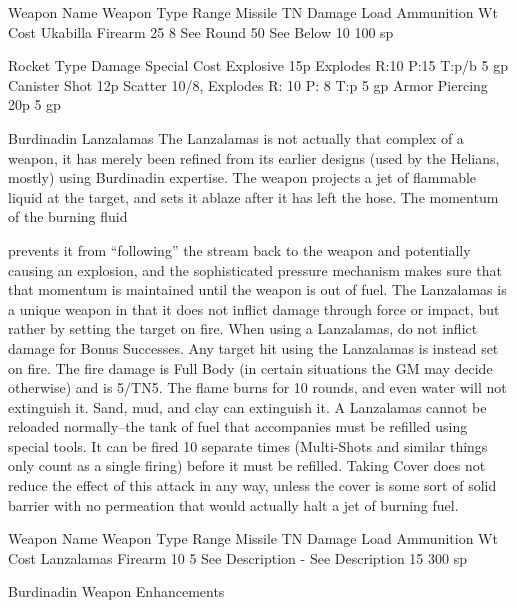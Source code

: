 \documentclass[oneside,11pt,english]{book}
\begin{document}
 

 

Weapon Name Weapon Type Range Missile TN Damage Load Ammunition Wt Cost 
Ukabilla Firearm 25 8 See Round 50 See Below 10 100 sp 

 

 

Rocket Type Damage Special Cost 
Explosive 15p Explodes R:10 P:15 T:p/b 5 gp 
Canister Shot 12p Scatter 10/8, Explodes R: 10 P: 8 T:p 5 gp 
Armor Piercing 20p 5 gp 

 

 

 

Burdinadin Lanzalamas 
The Lanzalamas is not actually that complex of a weapon, it has merely been refined from its earlier 
designs (used by the Helians, mostly) using Burdinadin expertise. The weapon projects a jet of flammable 
liquid at the target, and sets it ablaze after it has left the hose. The momentum of the burning fluid 


prevents it from “following” the stream back to the weapon and potentially causing an explosion, and the 
sophisticated pressure mechanism makes sure that that momentum is maintained until the weapon is out 
of fuel. 
The Lanzalamas is a unique weapon in that it does not inflict damage through force or impact, but rather 
by setting the target on fire. When using a Lanzalamas, do not inflict damage for Bonus Successes. Any 
target hit using the Lanzalamas is instead set on fire. The fire damage is Full Body (in certain situations 
the GM may decide otherwise) and is 5/TN5. The flame burns for 10 rounds, and even water will not 
extinguish it. Sand, mud, and clay can extinguish it. 
A Lanzalamas cannot be reloaded normally--the tank of fuel that accompanies must be refilled using 
special tools. It can be fired 10 separate times (Multi-Shots and similar things only count as a single 
firing) before it must be refilled. 
Taking Cover does not reduce the effect of this attack in any way, unless the cover is some sort of solid 
barrier with no permeation that would actually halt a jet of burning fuel. 

 

 

Weapon Name Weapon Type Range Missile TN Damage Load Ammunition Wt Cost 
Lanzalamas Firearm 10 5 See Description - See Description 15 300 sp 

 

 

Burdinadin Weapon Enhancements 
\end{document}
